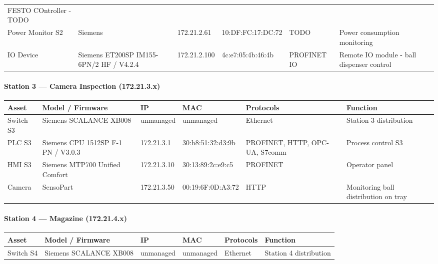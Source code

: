 {\begin{longtable}{L{2cm} L{2.1cm} L{2.1cm} L{2.6cm} L{2.4cm} L{4cm}}
    FESTO COntroller - TODO \\

    Power Monitor S2 & Siemens & 172.21.2.61 & 10:DF:FC:17:DC:72 & TODO & Power
    consumption monitoring \\

    IO Device & Siemens ET200SP IM155-6PN/2 HF / V4.2.4 & 172.21.2.100 &
    4c:e7:05:4b:46:4b & PROFINET IO & Remote IO module - ball dispenser control \\
\bottomrule
\end{longtable}

\paragraph{Station 3 --- Camera Inspection (172.21.3.x)}
\begin{longtable}{L{2cm} L{2.1cm} L{2.1cm} L{2.6cm} L{2.4cm} L{4cm}}
\toprule
\textbf{Asset} & \textbf{Model / Firmware} & \textbf{IP} & \textbf{MAC} & \textbf{Protocols} & \textbf{Function} \\
\midrule \endhead
    Switch S3 & Siemens SCALANCE XB008 & unmanaged & unmanaged & Ethernet &
    Station 3 distribution \\

    PLC S3 & Siemens CPU 1512SP F-1 PN / V3.0.3 & 172.21.3.1 & 30:b8:51:32:d3:9b &
    PROFINET, HTTP, OPC-UA, S7comm & Process control S3 \\

    HMI S3 & Siemens MTP700 Unified Comfort & 172.21.3.10 & 30:13:89:2c:e9:c5 &
    PROFINET & Operator panel \\

    Camera & SensoPart & 172.21.3.50 & 00:19:6F:0D:A3:72 & HTTP & Monitoring ball distribution on tray \\

\bottomrule
\end{longtable}

\paragraph{Station 4 --- Magazine (172.21.4.x)}
\begin{longtable}{L{2cm} L{2.1cm} L{2.1cm} L{2.6cm} L{2.4cm} L{4cm}}
\toprule
\textbf{Asset} & \textbf{Model / Firmware} & \textbf{IP} & \textbf{MAC} & \textbf{Protocols} & \textbf{Function} \\
\midrule \endhead
    Switch S4 & Siemens SCALANCE XB008 & unmanaged & unmanaged & Ethernet &
    Station 4 distribution \\


\end{longtable}}
